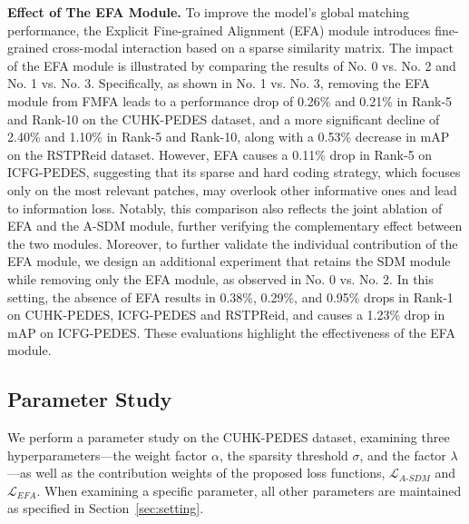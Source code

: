 \documentclass[acmsmall]{acmart}
\begin{document}
{\bfseries Effect of The EFA Module.} To improve the model's global
matching performance, the Explicit Fine-grained Alignment (EFA)
module introduces fine-grained cross-modal interaction based on a
sparse similarity matrix. The impact of the EFA module is
illustrated by comparing the results of No. 0 vs. No. 2 and No. 1
vs. No. 3. Specifically, as shown in No. 1 vs. No. 3, removing the
EFA module from FMFA leads to a performance drop of 0.26\% and
0.21\% in Rank-5 and Rank-10 on the CUHK-PEDES dataset, and a more
significant decline of 2.40\% and 1.10\% in Rank-5 and Rank-10,
along with a 0.53\% decrease in mAP on the RSTPReid dataset.
However, EFA causes a 0.11\% drop in Rank-5 on ICFG-PEDES,
suggesting that its sparse and hard coding strategy, which focuses
only on the most relevant patches, may overlook other informative
ones and lead to information loss. Notably, this comparison also
reflects the joint ablation of EFA and the A-SDM module, further
verifying the complementary effect between the two modules.
Moreover, to further validate the individual contribution of the EFA
module, we design an additional experiment that retains the SDM
module while removing only the EFA module, as observed in No. 0 vs.
No. 2. In this setting, the absence of EFA results in 0.38\%,
0.29\%, and 0.95\% drops in Rank-1 on CUHK-PEDES, ICFG-PEDES and
RSTPReid, and causes a 1.23\% drop in mAP on ICFG-PEDES. These
evaluations highlight the effectiveness of the EFA module.

\subsection{Parameter Study}

We perform a parameter study on the CUHK-PEDES dataset, examining
three hyperparameters---the weight factor $\alpha$, the sparsity
threshold $\sigma$, and the factor $\lambda$---as well as the
contribution weights of the proposed loss functions,
$\mathcal{L}_{A\text{-}SDM}$ and $\mathcal{L}_{EFA}$. When examining
a specific parameter, all other parameters are maintained as
specified in Section~\ref{sec:setting}.
\end{document}

